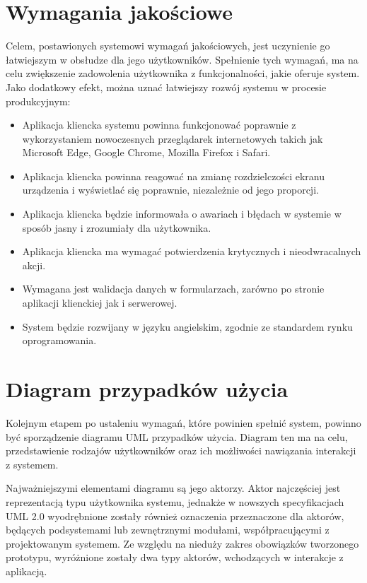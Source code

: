 \section{Wymagania jakościowe}

Celem, postawionych systemowi wymagań jakościowych, jest uczynienie go łatwiejszym w obsłudze dla jego użytkowników. Spełnienie tych wymagań, ma na celu zwiększenie zadowolenia użytkownika z funkcjonalności, jakie oferuje system. Jako dodatkowy efekt, można uznać łatwiejszy rozwój systemu w procesie produkcyjnym: 

\begin{itemize}
    \item Aplikacja kliencka systemu powinna funkcjonować poprawnie z wykorzystaniem nowoczesnych przeglądarek internetowych takich jak Microsoft Edge, Google Chrome, Mozilla Firefox i Safari.
    \item Aplikacja kliencka powinna reagować na zmianę rozdzielczości ekranu urządzenia i wyświetlać się poprawnie, niezależnie od jego proporcji.
    \item Aplikacja kliencka będzie informowała o awariach i błędach w systemie w sposób jasny i zrozumiały dla użytkownika.
    \item Aplikacja kliencka ma wymagać potwierdzenia krytycznych i nieodwracalnych akcji.
    \item Wymagana jest walidacja danych w formularzach, zarówno po stronie aplikacji klienckiej jak i serwerowej.
    \item System będzie rozwijany w języku angielskim, zgodnie ze standardem rynku oprogramowania.
\end{itemize}

\section{Diagram przypadków użycia}

Kolejnym etapem po ustaleniu wymagań, które powinien spełnić system, powinno być sporządzenie diagramu UML przypadków użycia. Diagram ten ma na celu, przedstawienie rodzajów użytkowników oraz ich możliwości nawiązania interakcji z systemem.

Najważniejszymi elementami diagramu są jego aktorzy. Aktor najczęściej jest reprezentacją typu użytkownika systemu, jednakże w nowszych specyfikacjach UML 2.0 wyodrębnione zostały również oznaczenia przeznaczone dla aktorów, będących podsystemami lub zewnętrznymi modułami, współpracującymi z projektowanym systemem. Ze względu na nieduży zakres obowiązków tworzonego prototypu, wyróżnione zostały dwa typy aktorów, wchodzących w interakcje z aplikacją.

